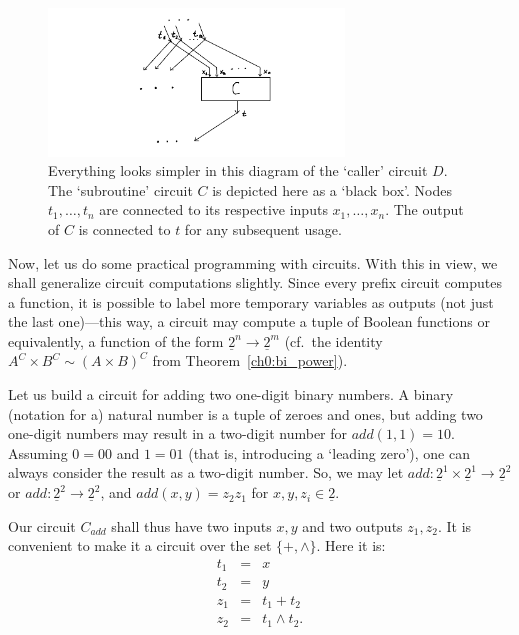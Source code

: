 \documentclass[12pt,notitlepage]{article}
\theoremstyle{plain}
\theoremstyle{definition}
\theoremstyle{plain}
\newcommand{\ul}[1]{\underline{#1}}
\newcommand{\1}{\mathbf{1}}
\newcommand{\0}{\mathbf{0}}
\begin{document}
\begin{figure}[h]
	\centering
	\includegraphics*[width=0.7\textwidth]{circuits_subst.pdf}
	\caption{Everything looks simpler in this diagram of the `caller' circuit $D$. The `subroutine' circuit $C$ is depicted here as a `black box'. Nodes $t_1, \ldots, t_n$ are connected to its respective inputs $x_1, \ldots, x_n$. The output of $C$ is connected to $t$ for any subsequent usage.}
\end{figure}

Now, let us do some practical programming with circuits. With this in view, we shall generalize circuit computations slightly. Since every prefix circuit computes a function, it is possible to label more temporary variables as outputs (not just the last one)---this way, a circuit may compute a tuple of Boolean functions or equivalently, a function of the form $\ul{2}^n \to \ul{2}^m$ (cf.~the identity $A^C \times B^C \sim (A \times B)^C$ from Theorem~\ref{ch0:bi_power}).

Let us build a circuit for adding two one-digit binary numbers. A binary (notation for a) natural number is a tuple of zeroes and ones, but adding two one-digit numbers may result in a two-digit number for $add(1, 1) = 10$. Assuming $0 = 00$ and $1 = 01$ (that is, introducing a `leading zero'), one can always consider the result as a two-digit number. So, we may let $add\colon \ul{2}^1 \times \ul{2}^1 \to \ul{2}^2$ or $add\colon \ul{2}^2 \to \ul{2}^2$, and $add(x, y) = z_2 z_1$ for $x, y, z_i \in \ul{2}$.

Our circuit $C_{add}$ shall thus have two inputs $x, y$ and two outputs $z_1, z_2$. It is convenient to make it a circuit over the set $\{{+}, {\wedge}\}$. Here it is:
$$
\begin{array}{rcl}
	t_1 &=& x\\
	t_2 &=& y\\
	z_1 &=& t_1 + t_2\\
	z_2 &=& t_1 \wedge t_2.\\
\end{array}
$$
\end{document}
